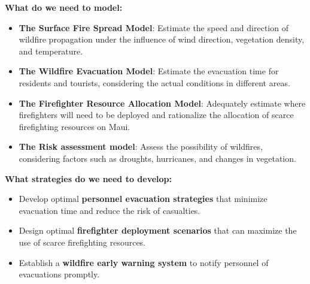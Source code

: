 \documentclass[12pt]{article}  %
\begin{document}
\textbf{What do we need to model:}

\begin{itemize}
	\setlength{\parsep}{0ex} 
	\setlength{\topsep}{2ex} 
	\setlength{\itemsep}{1ex}
	\item \textbf{The Surface Fire Spread Model}: Estimate the speed and direction of wildfire propagation under the influence of wind direction, vegetation density, and temperature.
	\item \textbf{The Wildfire Evacuation Model}: Estimate the evacuation time for residents and tourists, considering the actual conditions in different areas.
	\item \textbf{The Firefighter Resource Allocation Model}: Adequately estimate where firefighters will need to be deployed and rationalize the allocation of scarce firefighting resources on Maui.
	\item \textbf{The Risk assessment model}: Assess the possibility of wildfires, considering factors such as droughts, hurricanes, and changes in vegetation.
\end{itemize}

\textbf{What strategies do we need to develop:}

\begin{itemize}
	\setlength{\parsep}{0ex} 
	\setlength{\topsep}{2ex} 
	\setlength{\itemsep}{1ex}
	\item Develop optimal \textbf{personnel evacuation strategies} that minimize evacuation time and reduce the risk of casualties.
	\item Design optimal \textbf{firefighter deployment scenarios} that can maximize the use of scarce firefighting resources.
	\item Establish a \textbf{wildfire early warning system} to notify personnel of evacuations promptly.
\end{itemize}
\end{document}
